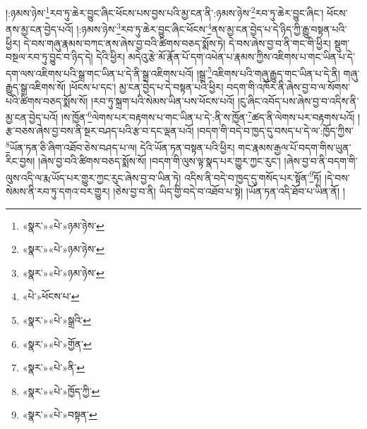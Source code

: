 །:ཉམས་ཉེས་\footnote{«སྣར་»«པེ་»ཉམ་ཉེས་}རབ་ཏུ་ཆེར་བྱུང་ཞིང་ཕོངས་པས་བྱས་པའི་མྱ་ངན་ནི་:ཉམས་ཉེས་\footnote{«སྣར་»«པེ་»ཉམ་ཉེས་}རབ་ཏུ་ཆེར་བྱུང་ཞིང་། ཕོངས་ནས་མྱ་ངན་བྱེད་པའོ། །:ཉམས་ཉེས་\footnote{«སྣར་»«པེ་»ཉམ་ཉེས་}རབ་ཏུ་ཆེར་བྱུང་ཞིང་ཕོངས་\footnote{«པེ་»ཕོངས་པ་}ནས་མྱ་ངན་བྱེད་པ་དེ་ཉིད་ཀྱི་རྒྱུ་བསྟན་པའི་ཕྱིར། དེ་བས་གཞུ་རྣམས་བཀང་ནས་ཞེས་བྱ་བའི་ཚིགས་བཅད་སྨོས་ཏེ། དེ་བས་ཞེས་བྱ་བ་ནི་གང་གི་ཕྱིར། སྡུག་བསྔལ་རབ་ཏུ་བྱུང་བ་ཉིད་དེ། དེའི་ཕྱིར། མདེའུ་རྩེ་མོ་རྣོན་པོ་དག་འཕེན་པ་རྣམས་ཀྱིས་འཇིགས་པ་གང་ཡིན་པ་དེ་དག་ལས་འཇིགས་པའི་སྒྲ་གང་ཡིན་པ་དེ་ནི་སྒྲ་འཇིགས་པའོ། །སྒྲ་\footnote{«སྣར་»«པེ་»སྒྲའི་}འཇིགས་པའི་གཞུ་རྒྱུད་གང་ཡིན་པ་དེ་ནི། གཞུ་རྒྱུད་སྒྲ་འཇིགས་སོ། །ཕོངས་པ་དང་། མྱ་ངན་བྱེད་པ་དེ་བསྟན་པའི་ཕྱིར། བདག་གི་འཁོར་ནི་ཞེས་བྱ་བ་ལ་སོགས་པའི་ཚིགས་བཅད་སྨོས་སོ། །རབ་ཏུ་སྐྲག་པའི་སེམས་ཡིན་པས་ཕོངས་པའོ། །ངུ་ཞིང་འབོད་པས་ཞེས་བྱ་བ་འདིས་ནི་མྱ་ངན་བྱེད་པའོ། །ས་ཁྱོན་\footnote{«སྣར་»«པེ་»གྱོན་}ལེགས་པར་བརྟགས་པ་གང་ཡིན་པ་དེ་:ནི་ས་ཁྱོན་\footnote{«སྣར་»«པེ་»ནི་}ཚད་ནི་ལེགས་པར་བརྟགས་པའོ། །རྩ་བཅས་ཞེས་བྱ་བས་ནི་སྔར་བཤད་པའི་རྩ་བ་དང་ལྡན་པའོ། །བདག་གི་བདེ་བ་ཁྱད་དུ་བསད་པ་དེ་ལ་:ཁྱོད་ཀྱིས་\footnote{«སྣར་»«པེ་»ཁྱོད་ཀྱི་}ཡོན་ཏན་ཅི་ཞིག་འཐོབ་ཅེས་བཤད་པ་ལ། དེའི་ཡོན་ཏན་བསྟན་པའི་ཕྱིར། གང་རྣམས་རྒྱལ་པོ་བདག་གིས་ཡུན་རིང་བྱས། །ཞེས་བྱ་བའི་ཚིགས་བཅད་སྨོས་སོ། །བདག་གི་ལུས་ལྟ་སྣད་པར་གྱུར་ཀྱང་རུང་། །ཞེས་བྱ་བ་ནི་བདག་གི་ལུས་འདི་ལ་རྨ་ཡོད་པར་གྱུར་ཀྱང་རུང་ཞེས་བྱ་བ་ཡིན་ཏེ། འདིས་ནི་བདེ་བ་ཁྱད་དུ་གསོད་པར་སྟོན་\footnote{«སྣར་»«པེ་»བསྟན་}ཏོ། །དེ་བས་སེམས་ནི་རབ་ཏུ་དགའ་བར་གྱུར། །ཅེས་བྱ་བ་ནི། ཡིད་གྱི་བདེ་བ་འཐོབ་པ་སྟེ། །ཡོན་ཏན་འདི་ཐོབ་པ་ཡིན་ནོ། །
